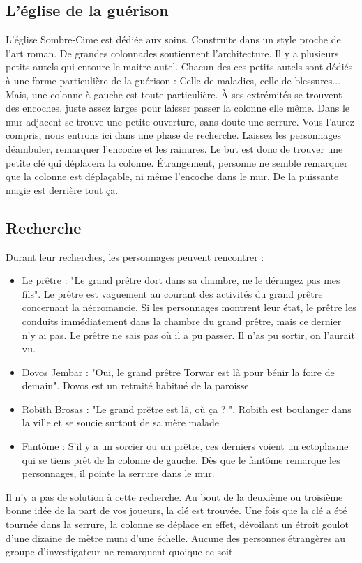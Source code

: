 \documentclass[a4paper, 11pt]{article}
\begin{document}
\subsection{L'église de la guérison}
L'église Sombre-Cime est dédiée aux soins. Construite dans un style proche de l'art roman. De grandes colonnades soutiennent l'architecture. Il y a plusieurs petits autels qui entoure le maitre-autel. Chacun des ces petits autels sont dédiés à une forme particulière de la guérison : Celle de maladies, celle de blessures... Mais, une colonne à gauche est toute particulière. À ses extrémités se trouvent des encoches, juste assez larges pour laisser passer la colonne elle même. Dans le mur adjacent se trouve une petite ouverture, sans doute une serrure. Vous l'aurez compris, nous entrons ici dans une phase de recherche. Laissez les personnages déambuler, remarquer l'encoche et les rainures. Le but est donc de trouver une petite clé qui déplacera la colonne. Étrangement, personne ne semble remarquer que la colonne est déplaçable, ni même l'encoche dans le mur. De la puissante magie est derrière tout ça.

\subsection{Recherche}
Durant leur recherches, les personnages peuvent rencontrer :
\begin{itemize}
\item Le prêtre : "Le grand prêtre dort dans sa chambre, ne le dérangez pas mes fils". Le prêtre est vaguement au courant des activités du grand prêtre concernant la nécromancie. Si les personnages montrent leur état, le prêtre les conduits immédiatement dans la chambre du grand prêtre, mais ce dernier n'y ai pas. Le prêtre ne sais pas où il  a pu passer. Il n'as pu sortir, on l’aurait vu.
\item Dovos Jembar : "Oui, le grand prêtre Torwar est là pour bénir la foire de demain". Dovos est un retraité habitué de la paroisse.
\item Robith Brosas : "Le grand prêtre est là, où ça ? ". Robith est boulanger dans la ville et se soucie surtout de sa mère malade
\item Fantôme : S'il y a un sorcier ou un prêtre, ces derniers voient un ectoplasme qui se tiens prêt de la colonne de gauche. Dès que le fantôme remarque les personnages, il pointe la serrure dans le mur.
\end{itemize}

Il n'y a pas de solution à cette recherche. Au bout de la deuxième ou troisième bonne idée de la part de vos joueurs, la clé est trouvée.
\newline
Une fois que la clé a été tournée dans la serrure, la colonne se déplace en effet, dévoilant un étroit goulot d'une dizaine de mètre muni d'une échelle. Aucune des personnes étrangères au groupe d'investigateur ne remarquent quoique ce soit.
\end{document}
